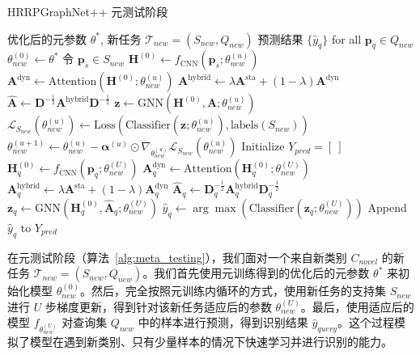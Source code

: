 \begin{algorithm}[htbp]
\caption{HRRPGraphNet++ 元测试阶段}
\label{alg:meta_testing}
\begin{algorithmic}[1]
    \REQUIRE 优化后的元参数 $\theta^*$, 新任务 $\mathcal{T}_{new} = (S_{new}, Q_{new})$
    \ENSURE 预测结果 $\{\hat{y}_q\}$ for all $\mathbf{p}_q \in Q_{new}$
    \STATE $\theta_{new}^{(0)} \leftarrow \theta^*$ %
        \STATE 令 $\mathbf{p}_s \in S_{new}$
        \STATE $\mathbf{H}^{(0)} \leftarrow f_{\text{CNN}}(\mathbf{p}_s; \theta_{new}^{(u)})$
        \STATE $\mathbf{A}^{\text{dyn}} \leftarrow \text{Attention}(\mathbf{H}^{(0)}; \theta_{new}^{(u)})$
        \STATE $\mathbf{A}^{\text{hybrid}} \leftarrow \lambda \mathbf{A}^{\text{sta}} + (1-\lambda) \mathbf{A}^{\text{dyn}}$
        \STATE $\hat{\mathbf{A}} \leftarrow \mathbf{D}^{-\frac{1}{2}} \mathbf{A}^{\text{hybrid}} \mathbf{D}^{-\frac{1}{2}}$
        \STATE $\mathbf{z} \leftarrow \text{GNN}(\mathbf{H}^{(0)}, \hat{\mathbf{A}}; \theta_{new}^{(u)})$
        \STATE $\mathcal{L}_{S_{new}}(\theta_{new}^{(u)}) \leftarrow \text{Loss}( \text{Classifier}(\mathbf{z}; \theta_{new}^{(u)}), \text{labels}(S_{new}) )$
        \STATE $\theta_{new}^{(u+1)} \leftarrow \theta_{new}^{(u)} - \boldsymbol{\alpha}^{(u)} \odot \nabla_{\theta_{new}^{(u)}} \mathcal{L}_{S_{new}}(\theta_{new}^{(u)})$ %
    \ENDFOR
    \STATE %
    \STATE Initialize $Y_{pred} = [~]$
        \STATE $\mathbf{H}_q^{(0)} \leftarrow f_{\text{CNN}}(\mathbf{p}_q; \theta_{new}^{(U)})$
        \STATE $\mathbf{A}_q^{\text{dyn}} \leftarrow \text{Attention}(\mathbf{H}_q^{(0)}; \theta_{new}^{(U)})$
        \STATE $\mathbf{A}_q^{\text{hybrid}} \leftarrow \lambda \mathbf{A}^{\text{sta}} + (1-\lambda) \mathbf{A}_q^{\text{dyn}}$
        \STATE $\hat{\mathbf{A}}_q \leftarrow \mathbf{D}_q^{-\frac{1}{2}} \mathbf{A}_q^{\text{hybrid}} \mathbf{D}_q^{-\frac{1}{2}}$
        \STATE $\mathbf{z}_q \leftarrow \text{GNN}(\mathbf{H}_q^{(0)}, \hat{\mathbf{A}}_q; \theta_{new}^{(U)})$
        \STATE $\hat{y}_q \leftarrow \arg\max (\text{Classifier}(\mathbf{z}_q; \theta_{new}^{(U)}))$
        \STATE Append $\hat{y}_q$ to $Y_{pred}$
    \ENDFOR
\end{algorithmic}
\end{algorithm}
在元测试阶段（算法~\ref{alg:meta_testing}），我们面对一个来自新类别 $C_{novel}$ 的新任务 $\mathcal{T}_{new} = (S_{new}, Q_{new})$。我们首先使用元训练得到的优化后的元参数 $\theta^*$ 来初始化模型 $\theta_{new}^{(0)}$。然后，完全按照元训练内循环的方式，使用新任务的支持集 $S_{new}$ 进行 $U$ 步梯度更新，得到针对该新任务适应后的参数 $\theta_{new}^{(U)}$。最后，使用适应后的模型 $f_{\theta_{new}^{(U)}}$ 对查询集 $Q_{new}$ 中的样本进行预测，得到识别结果 $\hat{y}_{query}$。这个过程模拟了模型在遇到新类别、只有少量样本的情况下快速学习并进行识别的能力。

